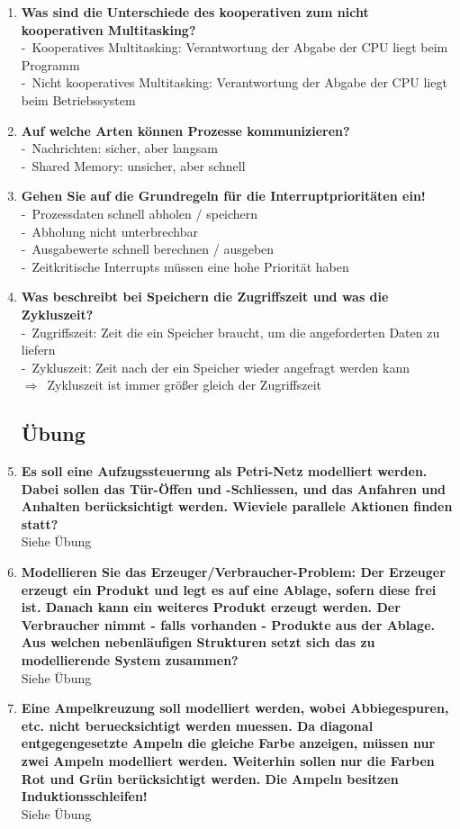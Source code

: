 \documentclass[a4paper,12pt]{article}
\newcommand{\questionnopage}[2]{\pagebreak[3]\item {\textbf{#1?}}#2}
\newcommand{\statementnopage}[2]{\pagebreak[3]\item {\textbf{#1!}}#2}
\newcommand{\catchword}[1]{\\-\ #1}
\newcommand{\normaltext}[1]{\\#1}
\newcommand{\result}[1]{\\$\Rightarrow$\ #1}
\begin{document}
\begin{enumerate}
  \questionnopage{Was sind die Unterschiede des kooperativen zum nicht kooperativen Multitasking}
  {
    \catchword{Kooperatives Multitasking: Verantwortung der Abgabe der CPU liegt beim Programm}
    \catchword{Nicht kooperatives Multitasking: Verantwortung der Abgabe der CPU liegt beim
               Betriebssystem}
  }

  \questionnopage{Auf welche Arten können Prozesse kommunizieren}
  {
    \catchword{Nachrichten: sicher, aber langsam}
    \catchword{Shared Memory: unsicher, aber schnell}
  }

  \statementnopage{Gehen Sie auf die Grundregeln für die Interruptprioritäten ein}
  {
    \catchword{Prozessdaten schnell abholen / speichern}
    \catchword{Abholung nicht unterbrechbar}
    \catchword{Ausgabewerte schnell berechnen / ausgeben}
    \catchword{Zeitkritische Interrupts müssen eine hohe Priorität haben}
  }

  \questionnopage{Was beschreibt bei Speichern die Zugriffszeit und was die Zykluszeit}
  {
    \catchword{Zugriffszeit: Zeit die ein Speicher braucht, um die angeforderten Daten zu liefern}
    \catchword{Zykluszeit: Zeit nach der ein Speicher wieder angefragt werden kann}
    \result {Zykluszeit ist immer größer gleich der Zugriffszeit}
  }

  \subsection{Übung}

  \questionnopage{Es soll eine Aufzugssteuerung als Petri-Netz modelliert werden.
                  Dabei sollen das Tür-Öffen und -Schliessen, und das Anfahren und
                  Anhalten berücksichtigt werden. Wieviele parallele Aktionen
                  finden statt}
  {
    \normaltext{Siehe Übung}
  }

  \questionnopage{Modellieren Sie das Erzeuger/Verbraucher-Problem: Der Erzeuger
                  erzeugt ein Produkt und legt es auf eine Ablage, sofern diese
                  frei ist. Danach kann ein weiteres Produkt erzeugt werden. Der
                  Verbraucher nimmt - falls vorhanden - Produkte aus der Ablage.
                  Aus welchen nebenläufigen Strukturen setzt sich das zu
                  modellierende System zusammen}
  {
    \normaltext{Siehe Übung}
  }

  \statementnopage{Eine Ampelkreuzung soll modelliert werden, wobei Abbiegespuren,
                   etc. nicht beruecksichtigt werden muessen. Da diagonal
                   entgegengesetzte Ampeln die gleiche Farbe anzeigen, müssen nur
                   zwei Ampeln modelliert werden. Weiterhin sollen nur die Farben
                   Rot und Grün berücksichtigt werden. Die Ampeln besitzen
                   Induktionsschleifen}
  {
    \normaltext{Siehe Übung}
  }


\end{enumerate}
\end{document}
